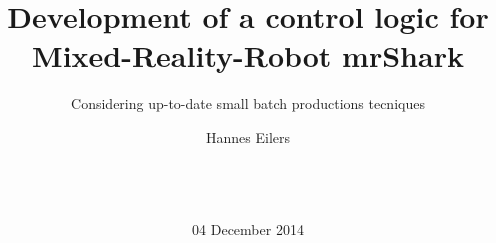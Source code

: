 \documentclass{acm_proc_article-sp}
\begin{document}
\title{Development of a control logic for\\Mixed-Reality-Robot mrShark}
\subtitle{Considering up-to-date small batch productions tecniques}
%
%
%
%
%

%
\author{
%
%
\alignauthor
Hannes Eilers\\
       \\
       \\
       \\
}
\additionalauthors{}
\date{04 December 2014}
\end{document}
